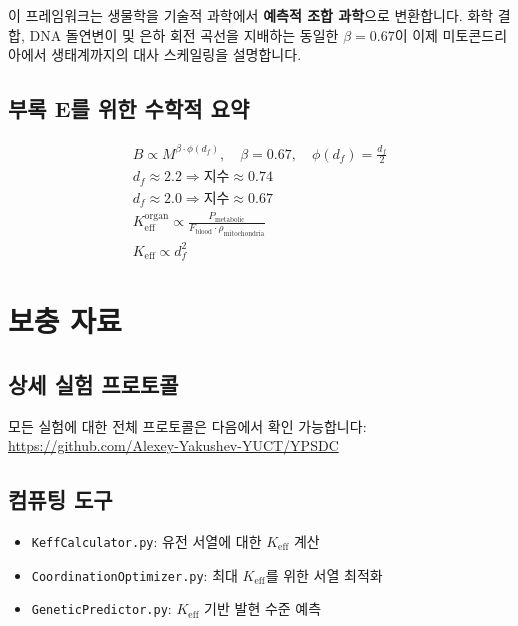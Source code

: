 \documentclass[11pt,a4paper]{article}
\newcommand{\Keff}{K_{\mathrm{eff}}}
\begin{document}
	이 프레임워크는 생물학을 기술적 과학에서 \textbf{예측적 조합 과학}으로 변환합니다. 화학 결합, DNA 돌연변이 및 은하 회전 곡선을 지배하는 동일한 \(\beta = 0.67\)이 이제 미토콘드리아에서 생태계까지의 대사 스케일링을 설명합니다.
	
	\subsection{부록 E를 위한 수학적 요약}
	
	\begin{align}
		\boxed{B \propto M^{\beta \cdot \phi(d_f)},\quad \beta = 0.67,\quad \phi(d_f) = \frac{d_f}{2}} \\
		\boxed{d_f \approx 2.2 \Rightarrow \text{지수} \approx 0.74} \\
		\boxed{d_f \approx 2.0 \Rightarrow \text{지수} \approx 0.67} \\
		\boxed{\Keff^{\text{organ}} \propto \frac{P_{\text{metabolic}}}{F_{\text{blood}} \cdot \rho_{\text{mitochondria}}}} \\
		\boxed{\Keff \propto d_f^{2}}
	\end{align}
	
	\appendix
	\section{보충 자료}
	
	\subsection{상세 실험 프로토콜}
	
	모든 실험에 대한 전체 프로토콜은 다음에서 확인 가능합니다:\\
	\url{https://github.com/Alexey-Yakushev-YUCT/YPSDC}
	
	\subsection{컴퓨팅 도구}
	
	\begin{itemize}
		\item \texttt{KeffCalculator.py}: 유전 서열에 대한 \(K_{\text{eff}}\) 계산
		\item \texttt{CoordinationOptimizer.py}: 최대 \(K_{\text{eff}}\)를 위한 서열 최적화
		\item \texttt{GeneticPredictor.py}: \(K_{\text{eff}}\) 기반 발현 수준 예측
	\end{itemize}
	
\end{document}
